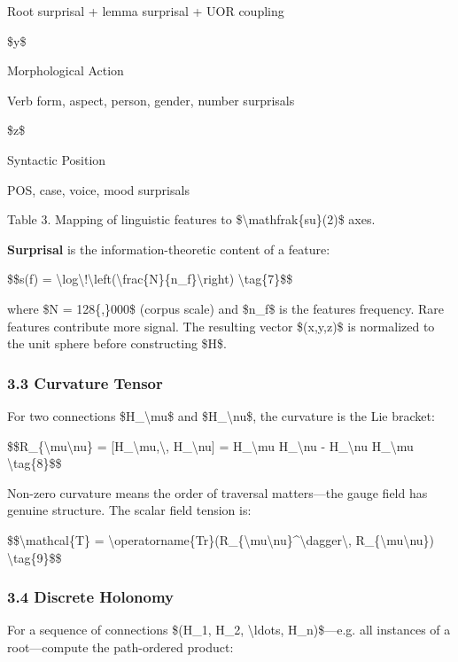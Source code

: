 \documentclass[12pt,a4paper]{article}
\begin{document}
Root surprisal + lemma surprisal + UOR coupling

\$y\$

Morphological Action

Verb form, aspect, person, gender, number surprisals

\$z\$

Syntactic Position

POS, case, voice, mood surprisals

Table 3. Mapping of linguistic features to
\$\textbackslash mathfrak\{su\}(2)\$ axes.

\textbf{Surprisal} is the information-theoretic content of a feature:

\$\$s(f) =
\textbackslash log\textbackslash!\textbackslash left(\textbackslash frac\{N\}\{n\_f\}\textbackslash right)
\textbackslash tag\{7\}\$\$

where \$N = 128\{,\}000\$ (corpus scale) and \$n\_f\$ is the
feature\textquotesingle s frequency. Rare features contribute more
signal. The resulting vector \$(x,y,z)\$ is normalized to the unit
sphere before constructing \$H\$.

\subsubsection{3.3 Curvature Tensor}\label{curvature-tensor}

For two connections \$H\_\textbackslash mu\$ and
\$H\_\textbackslash nu\$, the curvature is the Lie bracket:

\$\$R\_\{\textbackslash mu\textbackslash nu\} =
{[}H\_\textbackslash mu,\textbackslash, H\_\textbackslash nu{]} =
H\_\textbackslash mu H\_\textbackslash nu - H\_\textbackslash nu
H\_\textbackslash mu \textbackslash tag\{8\}\$\$

Non-zero curvature means the order of traversal matters---the gauge
field has genuine structure. The scalar field tension is:

\$\$\textbackslash mathcal\{T\} =
\textbackslash operatorname\{Tr\}(R\_\{\textbackslash mu\textbackslash nu\}\^{}\textbackslash dagger\textbackslash,
R\_\{\textbackslash mu\textbackslash nu\}) \textbackslash tag\{9\}\$\$

\subsubsection{3.4 Discrete Holonomy}\label{discrete-holonomy}

For a sequence of connections \$(H\_1, H\_2, \textbackslash ldots,
H\_n)\$---e.g. all instances of a root---compute the path-ordered
product:
\end{document}
